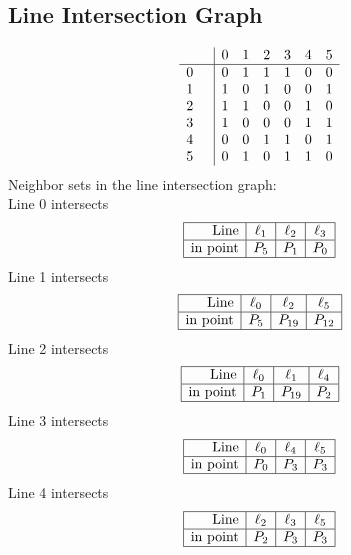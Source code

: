 \documentclass{article}
\begin{document}
{\subsection*{Line Intersection Graph}
{\arraycolsep=1pt
$$
\begin{array}{rr|*{6}r}
 &  & 0 & 1 & 2 & 3 & 4 & 5\\
\hline
0 &  & 0 & 1 & 1 & 1 & 0 & 0\\
1 &  & 1 & 0 & 1 & 0 & 0 & 1\\
2 &  & 1 & 1 & 0 & 0 & 1 & 0\\
3 &  & 1 & 0 & 0 & 0 & 1 & 1\\
4 &  & 0 & 0 & 1 & 1 & 0 & 1\\
5 &  & 0 & 1 & 0 & 1 & 1 & 0\\
\end{array}
$$
}%
Neighbor sets in the line intersection graph:\\
Line 0 intersects 
$$
\begin{array}{|r*{3}{|c}|}
\hline
\mbox{Line}  & \ell_{1} & \ell_{2} & \ell_{3}\\
\hline
\mbox{in point}  & P_{5} & P_{1} & P_{0}\\
\hline
\end{array}
$$
Line 1 intersects 
$$
\begin{array}{|r*{3}{|c}|}
\hline
\mbox{Line}  & \ell_{0} & \ell_{2} & \ell_{5}\\
\hline
\mbox{in point}  & P_{5} & P_{19} & P_{12}\\
\hline
\end{array}
$$
Line 2 intersects 
$$
\begin{array}{|r*{3}{|c}|}
\hline
\mbox{Line}  & \ell_{0} & \ell_{1} & \ell_{4}\\
\hline
\mbox{in point}  & P_{1} & P_{19} & P_{2}\\
\hline
\end{array}
$$
Line 3 intersects 
$$
\begin{array}{|r*{3}{|c}|}
\hline
\mbox{Line}  & \ell_{0} & \ell_{4} & \ell_{5}\\
\hline
\mbox{in point}  & P_{0} & P_{3} & P_{3}\\
\hline
\end{array}
$$
Line 4 intersects 
$$
\begin{array}{|r*{3}{|c}|}
\hline
\mbox{Line}  & \ell_{2} & \ell_{3} & \ell_{5}\\
\hline
\mbox{in point}  & P_{2} & P_{3} & P_{3}\\
\hline
\end{array}
$$}
\end{document}
